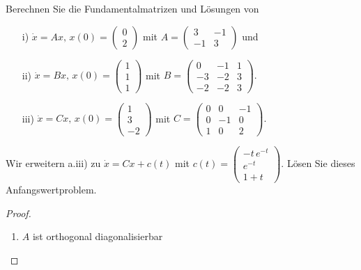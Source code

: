 \begin{Problem}
	\begin{parts}
		\item Berechnen Sie die Fundamentalmatrizen und Lösungen von
		\begin{enumerate}
			\item[i)] $\dot{x} = Ax, \, x(0) = \begin{pmatrix} 0 \\ 2 \end{pmatrix}$ mit 
			$
			A = \begin{pmatrix}
				3 & -1 \\
				-1 & 3
			\end{pmatrix}
			$
			und
			\item[ii)] $\dot{x} = Bx, \, x(0) = \begin{pmatrix} 1 \\ 1 \\ 1 \end{pmatrix}$ mit 
			$
			B = \begin{pmatrix}
				0 & -1 & 1 \\
				-3 & -2 & 3 \\
				-2 & -2 & 3
			\end{pmatrix}.
			$
			\item[iii)] $\dot{x} = Cx, \, x(0) = \begin{pmatrix} 1 \\ 3 \\ -2 \end{pmatrix}$ mit 
			$
			C = \begin{pmatrix}
				0 & 0 & -1 \\
				0 & -1 & 0 \\
				1 & 0 & 2
			\end{pmatrix}.
			$
		\end{enumerate}
		
		\item Wir erweitern a.iii) zu $\dot{x} = Cx + c(t)$ mit 
		$
		c(t) = \begin{pmatrix}
			-t \, e^{-t} \\
			e^{-t} \\
			1 + t
		\end{pmatrix}.
		$
		Lösen Sie dieses Anfangswertproblem.
	\end{parts}
\end{Problem}
\begin{proof}
	\begin{parts}
	\item 
		\begin{enumerate}[label=\roman*)]
			\item $A$ ist orthogonal diagonalisierbar 
		\end{enumerate}
	\end{parts}
\end{proof}
